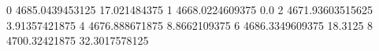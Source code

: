0 4685.0439453125 17.021484375
1 4668.0224609375 0.0
2 4671.93603515625 3.91357421875
4 4676.888671875 8.8662109375
6 4686.3349609375 18.3125
8 4700.32421875 32.3017578125
